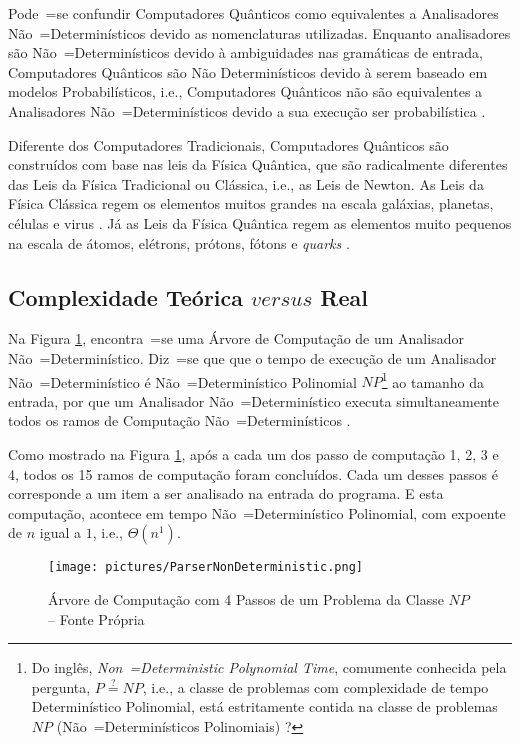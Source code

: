 {{    Pode~=se confundir Computadores Quânticos como equivalentes a Analisadores Não~=Determinísticos devido as nomenclaturas utilizadas.
    Enquanto analisadores são Não~=Determinísticos devido à ambiguidades nas gramáticas de entrada,
    Computadores Quânticos são Não Determinísticos devido à serem baseado em modelos Probabilísticos,
    i.e.,
    Computadores Quânticos não são equivalentes a Analisadores Não~=Determinísticos devido a sua execução ser probabilística \cite{polynomialQuantumComputers,probabilisticQuantumComputation,quantumSimulatorChagas}.

    Diferente dos Computadores Tradicionais,
    Computadores Quânticos são construídos com base nas leis da Física Quântica,
    que são radicalmente diferentes das Leis da Física Tradicional ou
    Clássica, i.e.,
    as Leis de Newton.
    As Leis da Física Clássica regem os elementos muitos grandes na escala galáxias,
    planetas, células e
    virus \cite{halliday2013fundamentals}.
    Já as Leis da Física Quântica regem as elementos muito pequenos na escala de átomos,
    elétrons, prótons, fótons e
    \textit{quarks} \cite{dicke1963QuantumPhysicsIntroduction}.
}

\subsection{Complexidade Teórica $versus$ Real}

    Na Figura \ref{fig:pictures/ParserNonDeterministic.png},
    encontra~=se uma Árvore de Computação de um Analisador Não~=Determinístico.
    Diz~=se que que o tempo de execução de um Analisador Não~=Determinístico é Não~=Determinístico Polinomial $NP$\footnote{
    Do inglês, \textit{Non~=Deterministic Polynomial Time},
    comumente conhecida pela pergunta,
    $P \stackrel{?}{=} NP$, i.e.,
    a classe de problemas com complexidade de tempo Determinístico Polinomial,
    está estritamente contida na classe de problemas $NP$ (Não~=Determinísticos Polinomiais) \cite{computationalComplexityAuroraBarak}?
    }
    ao tamanho da entrada,
    por que um Analisador Não~=Determinístico executa simultaneamente todos os ramos de Computação Não~=Determinísticos \cite{hopcroftBook}.

    Como mostrado na Figura \ref{fig:pictures/ParserNonDeterministic.png},
    após a cada um dos passo de computação 1,
    2, 3 e 4,
    todos os 15 ramos de computação foram concluídos.
    Cada um desses passos é corresponde a um item a ser analisado na entrada do programa.
    E esta computação,
    acontece em tempo Não~=Determinístico Polinomial,
    com expoente de $n$ igual a $1$,
    i.e.,
    $\Theta(n^1)$.
    \begin{figure}[h]
    \centering
    \texttt{[image: pictures/ParserNonDeterministic.png]}
    \caption[Árvore de Computação com 4 Passos de um Problema da Classe $NP$]{Árvore de Computação com 4 Passos de um Problema da Classe $NP$ -- Fonte Própria}
    \label{fig:pictures/ParserNonDeterministic.png}
    \end{figure}

}
